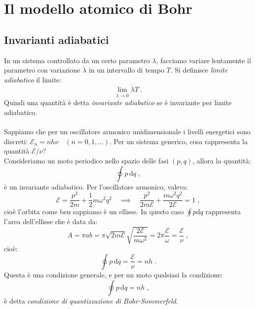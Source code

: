 \documentclass[12pt,a4paper]{report}
\theoremstyle{definition}
\numberwithin{equation}{section}
\newcommand{\diff}[1][]{\mathrm{d}#1}
\begin{document}
\section{Il modello atomico di Bohr}
\subsection{Invarianti adiabatici}
In un sistema controllato da un certo parametro $\lambda$, facciamo variare lentamente il parametro con variazione $\dot{\lambda}$ in un intervallo di tempo $T$. Si definisce \textit{limite adiabatico} il limite:
\begin{equation}
\lim_{\dot{\lambda}\to 0} \dot{\lambda}T\;.
\end{equation}
Quindi una quantità è detta \textit{invariante adiabatico} se è invariante per limite adiabatico. \\
\\
Sappiamo che per un oscillatore armonico unidimensionale i livelli energetici sono discreti: $\mathcal{E}_n=nh\nu \quad (n=0,1,\ldots)$. Per un sistema generico, cosa rappresenta la quantità $\mathcal{E}/\nu$? \\
Consideriamo un moto periodico nello spazio delle fasi $(p,q)$, allora la quantità:
$$
\oint p\,\diff{q}\;,
$$
è un invariante adiabatico. Per l'oscillatore armonico, valeva:
$$
\mathcal{E}=\frac{p^2}{2m}+\frac{1}{2}m\omega^2q^2\quad \implies\quad \frac{p^2}{2m\mathcal{E}}+\frac{m\omega^2q^2}{2\mathcal{E}}=1\;,
$$
cioè l'orbita come ben sappiamo è un ellisse. In questo caso $\oint p\diff{q}$ rappresenta l'area dell'ellisse che è data da:
$$
A=\pi a b= \pi \sqrt{2m\mathcal{E}}\sqrt{\frac{2\mathcal{E}}{m\omega^2}}=2\pi\frac{\mathcal{E}}{\omega}=\frac{\mathcal{E}}{\nu}\;,
$$
cioè:
\begin{equation*}
\oint p\,\diff{q}=\frac{\mathcal{E}}{\nu}=nh\;.
\end{equation*}
Questa è una condizione generale, e per un moto qualsiasi la condizione:
\begin{equation}
\oint p\,\diff{q}=nh\;,
\end{equation}
è detta \textit{condizione di quantizzazione di Bohr-Sommerfeld}.
\end{document}
